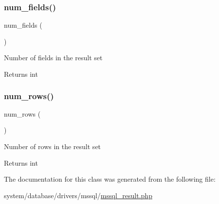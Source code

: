 \subsubsection{\texorpdfstring{num\+\_\+fields()}{num\_fields()}}
{\footnotesize\ttfamily num\+\_\+fields (\begin{DoxyParamCaption}{ }\end{DoxyParamCaption})}

Number of fields in the result set

\begin{DoxyReturn}{Returns}
int 
\end{DoxyReturn}
\mbox{\label{class_c_i___d_b__mssql__result_a218657c303ee499b97710ab0cd2f5d6e}} 
\subsubsection{\texorpdfstring{num\+\_\+rows()}{num\_rows()}}
{\footnotesize\ttfamily num\+\_\+rows (\begin{DoxyParamCaption}{ }\end{DoxyParamCaption})}

Number of rows in the result set

\begin{DoxyReturn}{Returns}
int 
\end{DoxyReturn}


The documentation for this class was generated from the following file\+:\begin{DoxyCompactItemize}
\item 
system/database/drivers/mssql/\mbox{\hyperlink{mssql__result_8php}{mssql\+\_\+result.\+php}}\end{DoxyCompactItemize}
